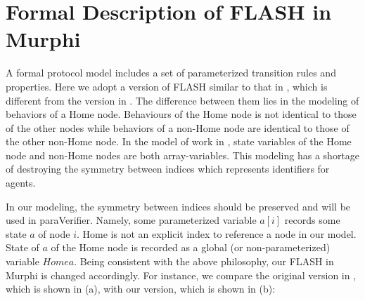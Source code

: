 \documentclass{llncs}
\begin{document}




\section{Formal Description of FLASH in Murphi\label{sec:formalDescription}}
A formal protocol model includes a set of parameterized transition rules and properties.  Here we adopt a version of FLASH similar to that in \cite{cubeicBeyond}, which is different from the version in \cite{Chou2004}. The difference between them lies in the modeling of behaviors of a Home node. Behaviours of the Home node is not identical to those of the other nodes while behaviors of
 a non-Home node are identical to those of the other non-Home node. In the model of work in \cite{Chou2004}, state variables of the Home node and non-Home nodes are both array-variables. This modeling has a shortage of destroying the symmetry between indices which represents identifiers for agents.

In our modeling, the symmetry between indices should be preserved and will be used in {\sf paraVerifier}. Namely,  %
some parameterized variable $a[i]$ records some state  $a$ of node $i$. Home is not an explicit index to reference a node in our model. State of
  $a$ of the Home node  is recorded as a global  (or non-parameterized) variable $Homea$. %
 Being consistent with the above philosophy, our FLASH in Murphi is changed accordingly. For instance, we compare the original version in \cite{Chou2004}, which is shown in (a), with our version, which is shown in (b):
\end{document}
